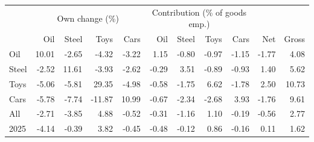 \begin{tabular}{lrrrrrrrrrr}
\toprule
 & \multicolumn{4}{c}{Own change (\%)} & \multicolumn{4}{c}{Contribution (\% of goods emp.)} & & \\
\cmidrule(lr){2-5}\cmidrule(lr){6-9}
 & Oil & Steel & Toys & Cars & Oil & Steel & Toys & Cars & Net & Gross \\
\midrule
Oil & 10.01 & -2.65 & -4.32 & -3.22 & 1.15 & -0.80 & -0.97 & -1.15 & -1.77 & 4.08 \\
Steel & -2.52 & 11.61 & -3.93 & -2.62 & -0.29 & 3.51 & -0.89 & -0.93 & 1.40 & 5.62 \\
Toys & -5.06 & -5.81 & 29.35 & -4.98 & -0.58 & -1.75 & 6.62 & -1.78 & 2.50 & 10.73 \\
Cars & -5.78 & -7.74 & -11.87 & 10.99 & -0.67 & -2.34 & -2.68 & 3.93 & -1.76 & 9.61 \\
All & -2.71 & -3.85 & 4.88 & -0.52 & -0.31 & -1.16 & 1.10 & -0.19 & -0.56 & 2.77 \\
2025 & -4.14 & -0.39 & 3.82 & -0.45 & -0.48 & -0.12 & 0.86 & -0.16 & 0.11 & 1.62 \\
\bottomrule
\end{tabular}
